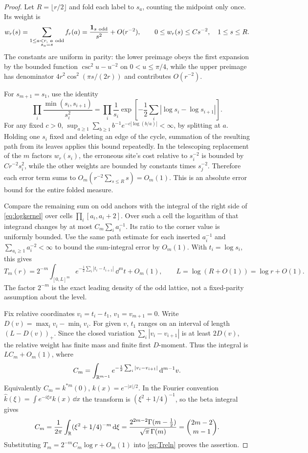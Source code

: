 \begin{proof}
Let \(R=\lfloor r/2\rfloor\) and fold each label to \(s_a\), counting
the midpoint only once. Its weight is
\[
 w_r(s)=\sum_{\substack{1\le a<r,\ a\ {\rm odd}\\s_a=s}}f_r(a)
     =\frac{\mathbf1_{s\ {\rm odd}}}{s^2}+O(r^{-2}),\qquad
 0\le w_r(s)\le C s^{-2},\quad 1\le s\le R.
\]
The constants are uniform in parity: the lower preimage obeys the
first expansion by the bounded function
\(\csc^2 u-u^{-2}\) on \(0<u\le\pi/4\), while the upper preimage
has denominator \(4r^2\cos^2(\pi s/(2r))\) and contributes
\(O(r^{-2})\).

For \(s_{m+1}=s_1\), use the identity
\begin{equation}\label{eq:logkernel}
 \prod_i\frac{\min(s_i,s_{i+1})}{s_i^2}
  =\prod_i\frac1{s_i}
    \exp\!\left[-\frac12\sum_i|\log s_i-\log s_{i+1}|\right].
\end{equation}
For any fixed \(c>0\),
\(\sup_{a\ge1}\sum_{b\ge1}b^{-1}e^{-c|\log(b/a)|}<\infty\),
by splitting at \(a\). Holding one \(s_i\) fixed and deleting an
edge of the cycle, summation of the resulting path from its leaves
applies this bound repeatedly. In the telescoping replacement of the
\(m\) factors \(w_r(s_i)\), the erroneous site's cost relative to
\(s_i^{-2}\) is bounded by \(C r^{-2}s_i^2\), while the other
weights are bounded by constants times \(s_j^{-2}\). Therefore
each error term sums to \(O_m(r^{-2}\sum_{s\le R}s)=O_m(1)\).
This is an absolute error bound for the entire folded measure.

Compare the remaining sum on odd anchors with the integral of
the right side of \eqref{eq:logkernel} over cells
\(\prod_i[a_i,a_i+2]\). Over such a cell the logarithm of that
integrand changes by at most \(C_m\sum_i a_i^{-1}\).
Its ratio to the corner value is uniformly bounded. Use the same
path estimate for each inserted \(a_i^{-1}\) and
\(\sum_{a_i\ge1}a_i^{-2}<\infty\) to bound the sum-integral
error by \(O_m(1)\). With \(t_i=\log s_i\), this gives
\[
 T_m(r)=2^{-m}\int_{[0,L]^m}
          e^{-\frac12\sum_i|t_i-t_{i+1}|}\,\dd^m t+O_m(1),
 \qquad L=\log(R+O(1))=\log r+O(1).
\]
The factor \(2^{-m}\) is the exact leading density of the odd
lattice, not a fixed-parity assumption about the level.

Fix relative coordinates \(v_i=t_i-t_1\), \(v_1=v_{m+1}=0\).
Write \(D(v)=\max_i v_i-\min_i v_i\). For given \(v\), \(t_1\)
ranges on an interval of length \((L-D(v))_+\). Since the closed
variation \(\sum_i|v_i-v_{i+1}|\) is at least \(2D(v)\), the relative
weight has finite mass and finite first \(D\)-moment. Thus the
integral is \(L C_m+O_m(1)\), where
\[
 C_m=\int_{\mathbb R^{m-1}} e^{-\frac12\sum_i|v_i-v_{i+1}|}\,\mathrm d^{m-1}v .
\]
Equivalently \(C_m=k^{*m}(0)\), \(k(x)=e^{-|x|/2}\). In the
Fourier convention \(\widehat k(\xi)=\int e^{-i\xi x}k(x)\,\dd x\)
the transform is \((\xi^2+1/4)^{-1}\), so the beta integral gives
\[
 C_m=\frac1{2\pi}\int_{\mathbb R}(\xi^2+1/4)^{-m}\,\mathrm d\xi
 =\frac{2^{2m-2}\Gamma(m-\frac12)}{\sqrt\pi\,\Gamma(m)}
 =\binom{2m-2}{m-1}.
\]
Substituting \(T_m=2^{-m}C_m\log r+O_m(1)\) into
\eqref{eq:Treln} proves the assertion.
\end{proof}

